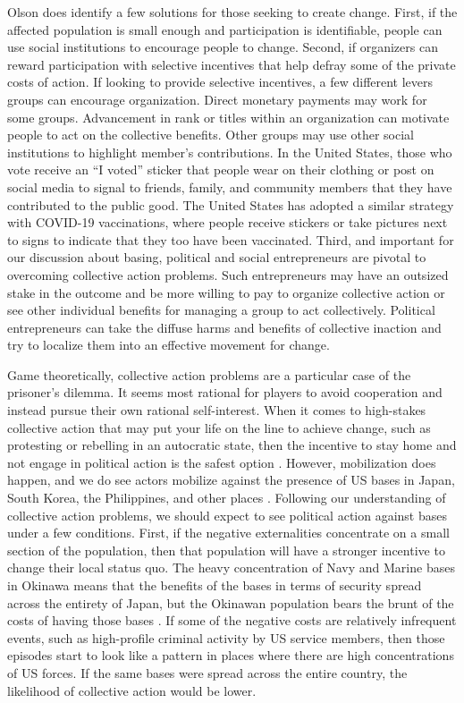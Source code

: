 {	Olson does identify a few solutions for those seeking to create change. First, if the affected population is small enough and participation is identifiable, people can use social institutions to encourage people to change. Second, if organizers can reward participation with selective incentives that help defray some of the private costs of action. If looking to provide selective incentives, a few different levers groups can encourage organization. Direct monetary payments may work for some groups. Advancement in rank or titles within an organization can motivate people to act on the collective benefits. Other groups may use other social institutions to highlight member's contributions. In the United States, those who vote receive an ``I voted'' sticker that people wear on their clothing or post on social media to signal to friends, family, and community members that they have contributed to the public good. The United States has adopted a similar strategy with COVID-19 vaccinations, where people receive stickers or take pictures next to signs to indicate that they too have been vaccinated. Third, and important for our discussion about basing, political and social entrepreneurs are pivotal to overcoming collective action problems. Such entrepreneurs may have an outsized stake in the outcome and be more willing to pay to organize collective action or see other individual benefits for managing a group to act collectively. Political entrepreneurs can take the diffuse harms and benefits of collective inaction and try to localize them into an effective movement for change.
	
	Game theoretically, collective action problems are a particular case of the prisoner's dilemma. It seems most rational for players to avoid cooperation and instead pursue their own rational self-interest. When it comes to high-stakes collective action that may put your life on the line to achieve change, such as protesting or rebelling in an autocratic state, then the incentive to stay home and not engage in political action is the safest option \cite{lichbach1993}. However, mobilization does happen, and we do see actors mobilize against the presence of US bases in Japan, South Korea, the Philippines, and other places \cite{lutz2009}. Following our understanding of collective action problems, we should expect to see political action against bases under a few conditions. First, if the negative externalities concentrate on a small section of the population, then that population will have a stronger incentive to change their local status quo. The heavy concentration of Navy and Marine bases in Okinawa means that the benefits of the bases in terms of security spread across the entirety of Japan, but the Okinawan population bears the brunt of the costs of having those bases \cite{akibayashi2009}. If some of the negative costs are relatively infrequent events, such as high-profile criminal activity by US service members, then those episodes start to look like a pattern in places where there are high concentrations of US forces. If the same bases were spread across the entire country, the likelihood of collective action would be lower.
	
}
